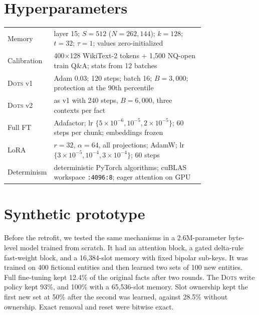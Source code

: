 \documentclass[11pt]{article}
\newcommand{\sys}{\textsc{Dots}}
\begin{document}
\section{Hyperparameters}
\noindent\begin{tabular}{@{}lp{0.78\linewidth}@{}}
\toprule
Memory & layer 15; $S=512$ ($N=262{,}144$); $k=128$; $t=32$; $\tau=1$; values zero-initialized \\
Calibration & 400$\times$128 WikiText-2 tokens + 1{,}500 NQ-open train Q\&A; stats from 12 batches \\
\sys{} v1 & Adam 0.03; 120 steps; batch 16; $B=3{,}000$; protection at the 90th percentile \\
\sys{} v2 & as v1 with 240 steps, $B=6{,}000$, three contexts per fact \\
Full FT & Adafactor; lr $\{5\!\times\!10^{-6}, 10^{-5}, 2\!\times\!10^{-5}\}$; 60 steps per chunk; embeddings frozen \\
LoRA & $r=32$, $\alpha=64$, all projections; AdamW; lr $\{3\!\times\!10^{-5}, 10^{-4}, 3\!\times\!10^{-4}\}$; 60 steps \\
Determinism & deterministic PyTorch algorithms; cuBLAS workspace \texttt{:4096:8}; eager attention on GPU \\
\bottomrule
\end{tabular}

\section{Synthetic prototype}
\label{app:proto}
Before the retrofit, we tested the same mechanisms in a 2.6M-parameter byte-level model trained from scratch. It had an attention block, a gated delta-rule fast-weight block, and a 16{,}384-slot memory with fixed bipolar sub-keys. It was trained on 400 fictional entities and then learned two sets of 100 new entities. Full fine-tuning kept 12.4\% of the original facts after two rounds. The \sys{} write policy kept 93\%, and 100\% with a 65{,}536-slot memory. Slot ownership kept the first new set at 50\% after the second was learned, against 28.5\% without ownership. Exact removal and reset were bitwise exact.
\end{document}
